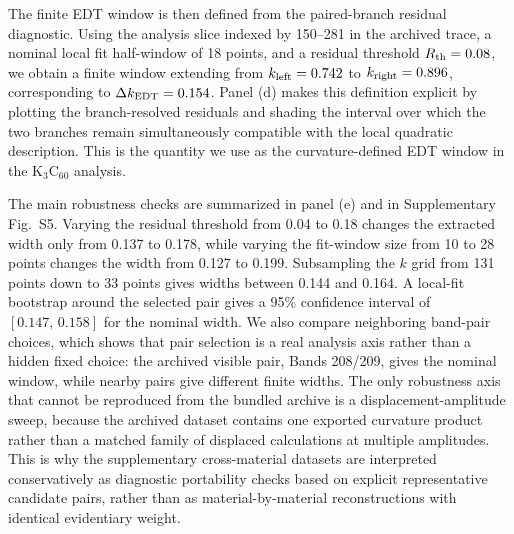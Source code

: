 ﻿\documentclass[aps,prx,reprint,superscriptaddress,longbibliography,floatfix]{revtex4-2}
\begin{document}
The finite EDT window is then defined from the paired-branch residual diagnostic. Using the analysis slice indexed by 150--281 in the archived trace, a nominal local fit half-window of 18 points, and a residual threshold $R_{\rm th}=0.08$, we obtain a finite window extending from $k_{\rm left}=0.742$ to $k_{\rm right}=0.896$, corresponding to $\Delta k_{\rm EDT}=0.154$. Panel (d) makes this definition explicit by plotting the branch-resolved residuals and shading the interval over which the two branches remain simultaneously compatible with the local quadratic description. This is the quantity we use as the curvature-defined EDT window in the K$_3$C$_{60}$ analysis.

The main robustness checks are summarized in panel (e) and in Supplementary Fig.~S5. Varying the residual threshold from 0.04 to 0.18 changes the extracted width only from 0.137 to 0.178, while varying the fit-window size from 10 to 28 points changes the width from 0.127 to 0.199. Subsampling the $k$ grid from 131 points down to 33 points gives widths between 0.144 and 0.164. A local-fit bootstrap around the selected pair gives a 95\% confidence interval of $[0.147,\,0.158]$ for the nominal width. We also compare neighboring band-pair choices, which shows that pair selection is a real analysis axis rather than a hidden fixed choice: the archived visible pair, Bands 208/209, gives the nominal window, while nearby pairs give different finite widths. The only robustness axis that cannot be reproduced from the bundled archive is a displacement-amplitude sweep, because the archived dataset contains one exported curvature product rather than a matched family of displaced calculations at multiple amplitudes. This is why the supplementary cross-material datasets are interpreted conservatively as diagnostic portability checks based on explicit representative candidate pairs, rather than as material-by-material reconstructions with identical evidentiary weight.
\end{document}
